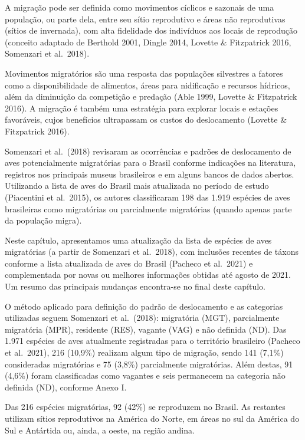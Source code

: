 \documentclass[
  oneside]{scrbook}
\begin{document}
A migração pode ser definida como movimentos cíclicos e sazonais de uma população, ou parte dela, entre seu sítio reprodutivo e áreas não reprodutivas (sítios de invernada), com alta fidelidade dos indivíduos aos locais de reprodução (conceito adaptado de Berthold 2001, Dingle 2014, Lovette \& Fitzpatrick 2016, Somenzari et al.~2018).

Movimentos migratórios são uma resposta das populações silvestres a fatores como a disponibilidade de alimentos, áreas para nidificação e recursos hídricos, além da diminuição da competição e predação (Able 1999, Lovette \& Fitzpatrick 2016). A migração é também uma estratégia para explorar locais e estações favoráveis, cujos benefícios ultrapassam os custos do deslocamento (Lovette \& Fitzpatrick 2016).

Somenzari et al.~(2018) revisaram as ocorrências e padrões de deslocamento de aves potencialmente migratórias para o Brasil conforme indicações na literatura, registros nos principais museus brasileiros e em alguns bancos de dados abertos. Utilizando a lista de aves do Brasil mais atualizada no período de estudo (Piacentini et al.~2015), os autores classificaram 198 das 1.919 espécies de aves brasileiras como migratórias ou parcialmente migratórias (quando apenas parte da população migra).

Neste capítulo, apresentamos uma atualização da lista de espécies de aves migratórias (a partir de Somenzari et al.~2018), com inclusões recentes de táxons conforme a lista atualizada de aves do Brasil (Pacheco et al.~2021) e complementada por novas ou melhores informações obtidas até agosto de 2021. Um resumo das principais mudanças encontra-se no final deste capítulo.

O método aplicado para definição do padrão de deslocamento e as categorias utilizadas seguem Somenzari et al.~(2018): migratória (MGT), parcialmente migratória (MPR), residente (RES), vagante (VAG) e não definida (ND). Das 1.971 espécies de aves atualmente registradas para o território brasileiro (Pacheco et al.~2021), 216 (10,9\%) realizam algum tipo de migração, sendo 141 (7,1\%) consideradas migratórias e 75 (3,8\%) parcialmente migratórias. Além destas, 91 (4,6\%) foram classificadas como vagantes e seis permanecem na categoria não definida (ND), conforme Anexo I.

Das 216 espécies migratórias, 92 (42\%) se reproduzem no Brasil. As restantes utilizam sítios reprodutivos na América do Norte, em áreas no sul da América do Sul e Antártida ou, ainda, a oeste, na região andina.
\end{document}
